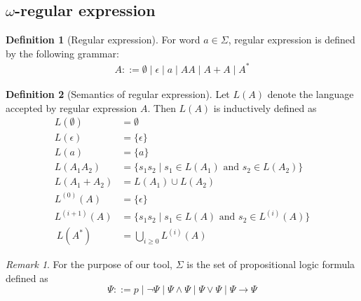 \documentclass[preprint,12pt]{elsarticle}
\theoremstyle{definition}
\newtheorem{definition}{Definition}[section]
\theoremstyle{remark}
\newtheorem{remark}{Remark}[section]
\newcommand{\limplies}{\rightarrow}
\begin{document}
\subsection{$\omega$-regular expression}
\begin{definition}[Regular expression]
    For word $a \in \Sigma$, regular expression is defined by the following grammar:
    \begin{align*}
        A ::= \emptyset \mid \epsilon \mid a \mid AA \mid A + A \mid A^*
    \end{align*}
\end{definition}
\begin{definition}[Semantics of regular expression]
    Let $L(A)$ denote the language accepted by regular expression $A$. Then $L(A)$ is inductively defined as
    \begin{align*}
        L(\emptyset) & = \emptyset \\
        L(\epsilon) & = \{\epsilon\} \\
        L(a) & = \{a\} \\
        L(A_1A_2) & = \{s_1s_2 \mid s_1 \in L(A_1) \text{ and } s_2 \in L(A_2)\} \\
        L(A_1 + A_2) & = L(A_1) \cup L(A_2) \\
        L^{(0)}(A) & = \{\epsilon\} \\
        L^{(i + 1)}(A) & = \{s_1s_2 \mid s_1 \in L(A) \text{ and } s_2 \in L^{(i)}(A)\} \\\
        L(A^*) & = \bigcup_{i \ge 0} L^{(i)}(A)
    \end{align*}
\end{definition}

\begin{remark}
    For the purpose of our tool, $\Sigma$ is the set of propositional logic formula defined as
    \[
    \Psi ::= p \mid \neg \Psi \mid \Psi \land \Psi \mid \Psi \lor \Psi \mid \Psi \limplies \Psi
    \]
\end{remark}
\end{document}
